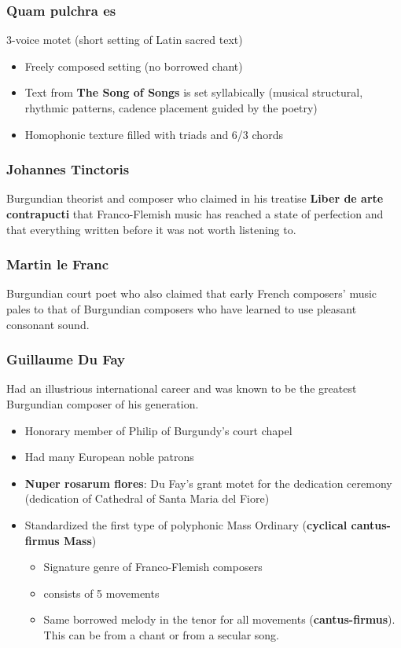 \documentclass{article}
\begin{document}
  \subsubsection{Quam pulchra es}
  3-voice motet (short setting of Latin sacred text)
  \begin{itemize}
    \item Freely composed setting (no borrowed chant)
    \item Text from \textbf{The Song of Songs} is set syllabically (musical structural, rhythmic patterns, cadence placement guided by the poetry)
    \item Homophonic texture filled with triads and 6/3 chords
  \end{itemize}
  \subsubsection{Johannes Tinctoris}
  Burgundian theorist and composer who claimed in his treatise \textbf{Liber de arte contrapucti} that Franco-Flemish music has reached a state of perfection and that everything written before it was not worth listening to.
  \subsubsection{Martin le Franc}
  Burgundian court poet who also claimed that early French composers' music pales to that of Burgundian composers who have learned to use pleasant consonant sound.
  \subsubsection{Guillaume Du Fay}
  Had an illustrious international career and was known to be the greatest Burgundian composer of his generation.
  \begin{itemize}
    \item Honorary member of Philip of Burgundy's court chapel
    \item Had many European noble patrons
    \item \textbf{Nuper rosarum flores}: Du Fay's grant motet for the dedication ceremony (dedication of Cathedral of Santa Maria del Fiore)
    \item Standardized the first type of polyphonic Mass Ordinary (\textbf{cyclical cantus-firmus Mass})
      \begin{itemize}
        \item Signature genre of Franco-Flemish composers
        \item consists of 5 movements
        \item Same borrowed melody in the tenor for all movements (\textbf{cantus-firmus}). This can be from a chant or from a secular song.
      \end{itemize}
  \end{itemize}
\end{document}
